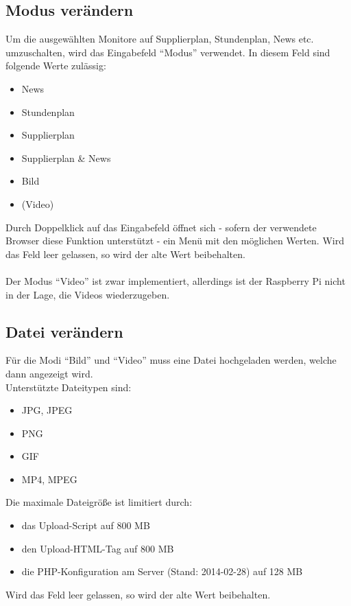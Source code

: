 \subsection{Modus verändern}

Um die ausgewählten Monitore auf Supplierplan, Stundenplan, News etc. umzuschalten, wird das Eingabefeld \enquote{Modus} verwendet. In diesem Feld sind folgende Werte zulässig:
\begin{itemize}
	\item News
	\item Stundenplan
	\item Supplierplan
	\item Supplierplan \& News
	\item Bild
	\item (Video)
\end{itemize}
Durch Doppelklick auf das Eingabefeld öffnet sich - sofern der verwendete Browser diese Funktion unterstützt - ein Menü mit den möglichen Werten. Wird das Feld leer gelassen, so wird der alte Wert beibehalten.\\
\\
Der Modus \enquote{Video} ist zwar implementiert, allerdings ist der Raspberry Pi nicht in der Lage, die Videos wiederzugeben.\\

\subsection{Datei verändern}

Für die Modi \enquote{Bild} und \enquote{Video} muss eine Datei hochgeladen werden, welche dann angezeigt wird.\\ 
Unterstützte Dateitypen sind:
\begin{itemize}
	\item JPG, JPEG
	\item PNG
	\item GIF
	\item MP4, MPEG
\end{itemize}
Die maximale Dateigröße ist limitiert durch:
\begin{itemize}
	\item das Upload-Script auf 800 MB
	\item den Upload-HTML-Tag auf 800 MB
	\item die PHP-Konfiguration am Server (Stand: 2014-02-28) auf 128 MB
\end{itemize}
Wird das Feld leer gelassen, so wird der alte Wert beibehalten.\\

